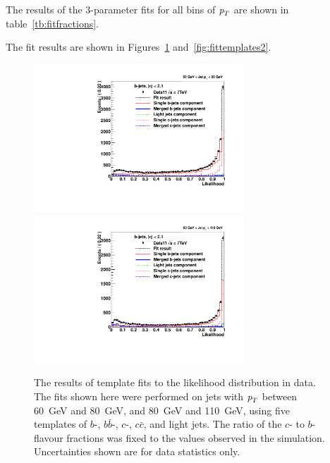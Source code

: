 The results of the 3-parameter fits for all bins of ${\emph{p}_{T}}$ are shown in table~\ref{tb:fitfractions}.

The fit results are shown in Figures~\ref{fig:fittemplates1} and~\ref{fig:fittemplates2}.


\begin{figure}[tp]
\centering
\includegraphics[width=0.7\textwidth]{FIGS/Fits/LikelihoodFit_3param_ETAFull_Bin1.pdf}
\includegraphics[width=0.7\textwidth]{FIGS/Fits/LikelihoodFit_3param_ETAFull_Bin2.pdf}
\caption{The results of template fits to the likelihood distribution in data. The fits shown here were performed on jets with ${\emph{p}_{T}}$ between  60~GeV and 80~GeV, and 80~GeV and 110~GeV, using five templates of $b$-, $b\bar{b}$-, $c$-, $c\bar{c}$, and light jets.  The ratio of the $c$- to $b$-flavour fractions was fixed to the values observed in the simulation.  Uncertainties shown are for data statistics only.  }
\label{fig:fittemplates1}
\end{figure}



